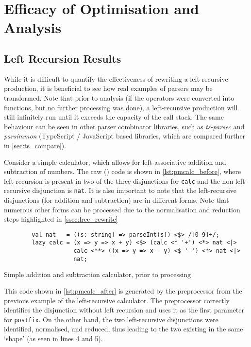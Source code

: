 \section{Efficacy of Optimisation and Analysis}
\label{sec:ev_oaa}

\subsection{Left Recursion Results}
\label{ssec:lrec_res}

While it is difficult to quantify the effectiveness of rewriting a left-recursive production, it is beneficial to see how real examples of parsers may be transformed.
Note that prior to analysis (if the operators were converted into functions, but no further processing was done), a left-recursive production will still infinitely run until it exceeds the capacity of the call stack.
The same behaviour can be seen in other parser combinator libraries, such as \textit{ts-parsec} and \textit{parsimmon} (TypeScript / JavaScript based libraries, which are compared further in \autoref{sec:ts_compare}).

Consider a simple calculator, which allows for left-associative addition and subtraction of numbers.
The raw (\tsext) code is shown in \autoref{lst:pmcalc_before}, where left recursion is present in two of the three disjunctions for \texttt{calc} and the non-left-recursive disjunction is \texttt{nat}.
It is also important to note that the left-recursive disjunctions (for addition and subtraction) are in different forms.
Note that numerous other forms can be processed due to the normalisation and reduction steps highlighted in \autoref{ssec:lrec_rewrite}

\begin{capminted}
    \begin{verbatim}
        val nat   = ((s: string) => parseInt(s)) <$> /[0-9]+/;
        lazy calc = (x => y => x + y) <$> (calc <* '+') <*> nat <|>
                    calc <**> ((x => y => x - y) <$ '-') <*> nat <|>
                    nat;
    \end{verbatim}
    \vspace{-0.5\baselineskip}
    \caption{Simple addition and subtraction calculator, prior to processing}
    \label{lst:pmcalc_before}
\end{capminted}

This code shown in \autoref{lst:pmcalc_after} is generated by the preprocessor from the previous example of the left-recursive calculator.
The preprocessor correctly identifies the disjunction without left recursion and uses it as the first parameter for \texttt{postfix}.
On the other hand, the two left-recursive disjunctions were identified, normalised, and reduced, thus leading to the two existing in the same `shape' (as seen in lines 4 and 5).

